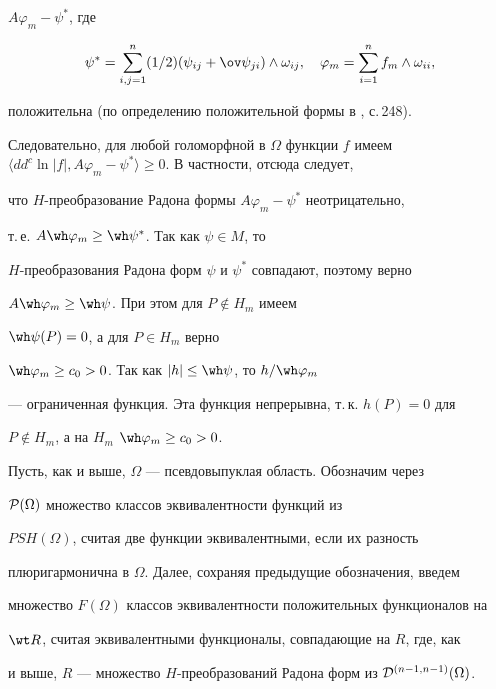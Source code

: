\begin{pf}
$A\varphi_m-\psi^{*}$, где


$$


\psi^{*}=\sum\limits_{i,j=1}^n(1/2)(\psi_{ij}+\ov\psi_{ji})


\wedge\omega_{ij},


\quad \varphi_m=\sum\limits_{i=1}^nf_m\wedge\omega_{ii},


$$


положительна (по определению положительной формы в \cite{Chirk1}, с.\,248). 


Следовательно, для любой голоморфной в $\Omega$ функции $f$ имеем $\langle 


dd^c\ln|f|,A\varphi_m-\psi^{*}\rangle\ge 0$. В частности, отсюда следует, 


что $H$-преобразование Радона формы $A\varphi_m-\psi^{*}$ неотрицательно,


т.\,е. $A\wh\varphi_m\ge\wh\psi^*$. Так как $\psi\in M$, то 


$H$-преобразования Радона форм $\psi$ и $\psi^{*}$ совпадают, поэтому верно 


$A\wh\varphi_m\ge\wh\psi$. При этом для $P\notin H_m$ имеем 


$\wh\psi(P)=0$, а для $P\in H_m$ верно


$\wh\varphi_m\ge c_0>0$. Так как $|h|\le \wh\psi$, то $h/\wh\varphi_m$ 


--- ограниченная функция. Эта функция непрерывна, т.\,к. $h(P)=0$ для 


$P\notin H_m$, а на $H_m$ $\wh\varphi_m\ge c_0>0$.


\end{pf}





Пусть, как и выше, $\Omega$ --- псевдовыпуклая область. Обозначим через 


${\cal P}(\Omega)$ множество классов эквивалентности функций из 


$PSH(\Omega)$, считая две функции эквивалентными, если их разность 


плюригармонична в $\Omega$. Далее, сохраняя предыдущие обозначения, введем 


множество $F(\Omega)$ классов эквивалентности положительных функционалов на 


$\wt R$, считая эквивалентными функционалы, совпадающие на $R$, где, как 


и выше, $R$ --- множество $H$-преобразований Радона форм из ${\cal 


D}^{(n-1,n-1)}(\Omega)$. 





